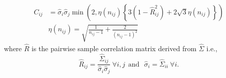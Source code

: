 \begin{equation}\label{eq:defineC}
\begin{aligned}
    C_{ij} & = \hat{\sigma}_{i} \hat{\sigma}_{j} \min \left (2,  \eta (n_{ij})  \left \{ 3 (1 - \hat{R}^2_{ij}) + 2 \sqrt{3} \eta (n_{ij}) \right \} \right ) \\
    & \eta(n_{ij})  = \sqrt{\frac{1}{n_{ij} - 1} + \frac{2}{(n_{ij} - 1)^2}}
\end{aligned}
\end{equation}
where $\hat{R}$ is the pairwise sample correlation matrix derived from $\hat{\Sigma}$ i.e., 
\begin{equation}\label{eq:defineRhat}
\hat{R}_{ij} = \frac{\hat{\Sigma}_{ij}}{\hat{\sigma}_{i}\hat{\sigma}_{j}}~\forall i,j ~~\text{and}~~~\hat{\sigma}_{i} = \hat{\Sigma}_{ii}~\forall i.
\end{equation}


